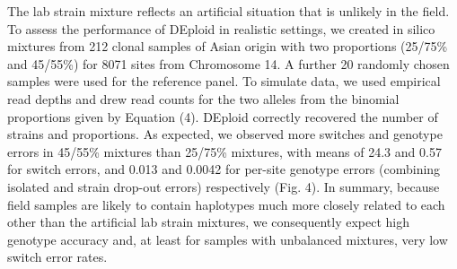 \documentclass{article}
\begin{document}
The lab strain mixture reflects an artificial situation that is unlikely in the field. To assess the performance of DEploid in realistic settings, we created in silico mixtures from 212 clonal samples of Asian origin with two proportions (25/75\% and 45/55\%) for 8071 sites from Chromosome 14. A further 20 randomly chosen samples were used for the reference panel. To simulate data, we used empirical read depths and drew read counts for the two alleles from the binomial proportions given by Equation (4). DEploid correctly recovered the number of strains and proportions. As expected, we observed more switches and genotype errors in 45/55\% mixtures than 25/75\% mixtures, with means of 24.3 and 0.57 for switch errors, and 0.013 and 0.0042 for per-site genotype errors (combining isolated and strain drop-out errors) respectively (Fig. 4). In summary, because field samples are likely to contain haplotypes much more closely related to each other than the artificial lab strain mixtures, we consequently expect high genotype accuracy and, at least for samples with unbalanced mixtures, very low switch error rates.
\end{document}
